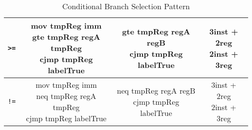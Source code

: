 \begin{table}[!ht]
\begin{tabular}{|c|c|c|c|}
        \verb|>=| & \makecell{mov tmpReg imm \\ gte tmpReg regA tmpReg \\ cjmp tmpReg labelTrue} & \makecell{gte tmpReg regA regB \\ cjmp tmpReg labelTrue} & \makecell{3inst + 2reg \\ 2inst + 3reg} \\ \hline
        \verb|!=| & \makecell{mov tmpReg imm \\ neq tmpReg regA tmpReg \\ cjmp tmpReg labelTrue} & \makecell{neq tmpReg regA regB \\ cjmp tmpReg labelTrue} & \makecell{3inst + 2reg \\ 2inst + 3reg} \\ \hline
    \end{tabular}
    \caption{Conditional Branch Selection Pattern}
    \label{table:conditional-branch-pattern}
\end{table}
